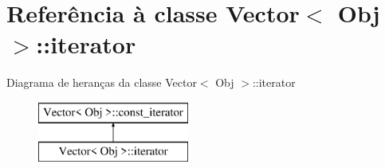 \hypertarget{class_vector_1_1iterator}{}\section{Referência à classe Vector$<$ Obj $>$\+:\+:iterator}
\label{class_vector_1_1iterator}
Diagrama de heranças da classe Vector$<$ Obj $>$\+:\+:iterator\begin{figure}[H]
\begin{center}
\leavevmode
\includegraphics[height=2.000000cm]{class_vector_1_1iterator}
\end{center}
\end{figure}

